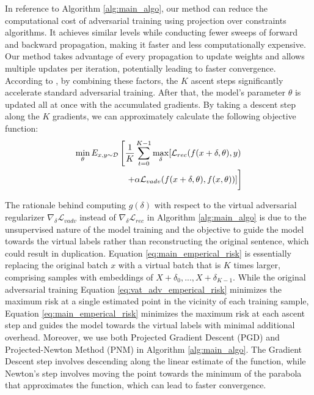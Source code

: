 \documentclass[letterpaper]{article} %
\begin{document}
In reference to Algorithm \ref{alg:main_algo}, our method can reduce the computational cost of adversarial training using projection over constraints algorithms. It achieves similar levels while conducting fewer sweeps of forward and backward propagation, making it faster and less computationally expensive. Our method takes advantage of every propagation to update weights and allows multiple updates per iteration, potentially leading to faster convergence. According to \citet{NEURIPS2019_812b4ba2}, by combining these factors, the $K$ ascent steps significantly accelerate standard adversarial training.  After that, the model's parameter $\theta$ is updated all at once with the accumulated gradients. By taking a descent step along the $K$ gradients, we can approximately calculate the following objective function:
\begin{equation}
    \begin{split}
        \min_{\theta}E_{x,y \sim \mathcal{D}} \left[ \frac{1}{K} \sum_{t=0}^{K-1} \max_{\delta} [ \mathcal{L}_{rec}(f(x + \delta,\theta), y) \right. \\
        \left. + \alpha \mathcal{L}_{vadv}(f(x+\delta,\theta),f(x,\theta)) ] \vphantom{\frac{1}{K}} \right]
    \end{split}
    \label{eq:main_emperical_risk}
\end{equation}

The rationale behind computing $g(\delta)$ with respect to the virtual adversarial regularizer $\nabla_{\delta} \mathcal{L}_{vadv}$ instead of $\nabla_{\delta} \mathcal{L}_{rec}$ in Algorithm \ref{alg:main_algo} is due to the unsupervised nature of the model training and the objective to guide the model towards the virtual labels rather than reconstructing the original sentence, which could result in duplication. Equation \ref{eq:main_emperical_risk} is essentially replacing the original batch $x$ with a virtual batch that is $K$ times larger, comprising samples with embeddings of $X + \delta_0,..., X + \delta_{K-1}$. While the original adversarial training Equation \ref{eq:vat_adv_emperical_risk} minimizes the maximum risk at a single estimated point in the vicinity of each training sample, Equation \ref{eq:main_emperical_risk} minimizes the maximum risk at each ascent step and guides the model towards the virtual labels with minimal additional overhead. Moreover, we use both Projected Gradient Descent (PGD) and Projected-Newton Method (PNM) in Algorithm \ref{alg:main_algo}. The Gradient Descent step involves descending along the linear estimate of the function, while Newton's step involves moving the point towards the minimum of the parabola that approximates the function, which can lead to faster convergence.
\end{document}
